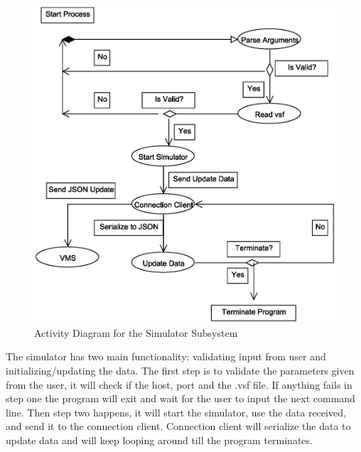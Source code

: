 \documentclass{article}
\begin{document}
\begin{figure}[!htb]
\caption{Activity Diagram for the Simulator Subsystem}
\centering
\includegraphics[scale=0.7]{diagrams/simulator-acitivity-diagram.eps}
\end{figure}
The simulator has two main functionality: validating input from user and initializing/updating the data. The first step is to validate the parameters given from the user, it will check if the host, port and the .vsf file. If anything fails in step one the program will exit and wait for the user to input the next command line. Then step two happens, it will start the simulator, use the data received, and send it to the connection client. Connection client will serialize the data to update data and will keep looping around till the program terminates.
\end{document}
